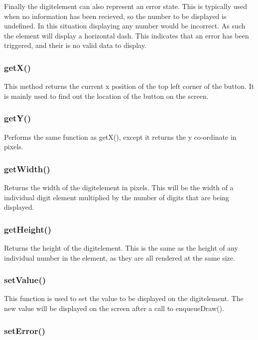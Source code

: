 Finally the digitelement can also represent an error state. This is typically used when no information has been recieved, so the number to be displayed is undefined. In this situation displaying any number would be incorrect. As such the element will display a horizontal dash. This indicates that an error has been triggered, and their is no valid data to display. 

\subsubsection{getX()}

This method returns the current x position of the top left corner of the button. It is mainly used to find out the location of the button on the screen.

\subsubsection{getY()}

Performs the same function as getX(), except it returns the y co-ordinate in pixels.

\subsubsection{getWidth()}

Returns the width of the digitelement in  pixels. This will be the width of a individual digit element multiplied by the number of digits that are being displayed.

\subsubsection{getHeight()}

Returns the height of the digitelement. This is the same as the height of any individual number in the element, as they are all rendered at the same size.

\subsubsection{setValue()}

This function is used to set the value to be displayed on the digitelement. The new value will be displayed on the screen after a call to enqueueDraw().

\subsubsection{setError()}

